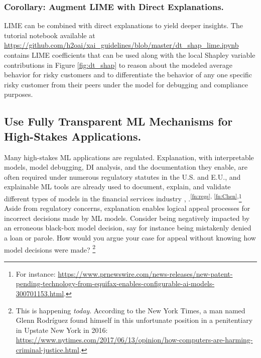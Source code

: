 \documentclass[sigconf]{acmart}
\begin{document}
\subsubsection{Corollary: Augment LIME with Direct Explanations.} LIME can be combined with direct explanations to yield deeper insights.  The tutorial notebook available at \url{https://github.com/h2oai/xai_guidelines/blob/master/dt_shap_lime.ipynb} contains LIME coefficients that can be used along with the local Shapley variable contributions in Figure \ref{fig:dt_shap} to reason about the modeled average behavior for risky customers and to differentiate the behavior of any one specific risky customer from their peers under the model for debugging and compliance purposes.

\subsection{Use Fully Transparent ML Mechanisms for High-Stakes Applications.} \label{sec:white_box}

Many high-stakes ML applications are regulated. Explanation, with interpretable models, model debugging, DI analysis, and the documentation they enable, are often required under numerous regulatory statutes in the U.S. and E.U., and explainable ML tools are already used to document, explain, and validate different types of models in the financial services industry \cite{lime-sup}, \cite{wf_xnn}.\textsuperscript{\ref{fn:regs}, \ref{fn:Chen},}\footnote{\scriptsize{For instance: \url{https://www.prnewswire.com/news-releases/new-patent-pending-technology-from-equifax-enables-configurable-ai-models-300701153.html}.}}\\

\vspace{-8pt}
\noindent Aside from regulatory concerns, explanation enables logical appeal processes for incorrect decisions made by ML models. Consider being negatively impacted by an erroneous black-box model decision, say for instance being mistakenly denied a loan or parole. How would you argue your case for appeal without knowing how model decisions were made? \footnote{This is happening \textit{today}. According to the New York Times, a man named Glenn Rodr\'iguez found himself in this unfortunate position in a penitentiary in Upstate New York in 2016: \url{https://www.nytimes.com/2017/06/13/opinion/how-computers-are-harming-criminal-justice.html}.}
\end{document}
